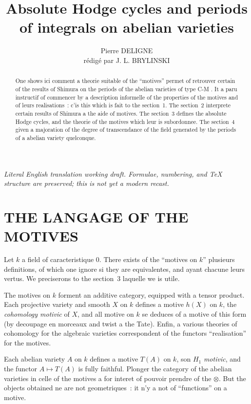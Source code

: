 \documentclass[12pt,a4paper]{article}
\title{Absolute Hodge cycles and periods of integrals on abelian varieties}
\author{Pierre DELIGNE\\\small rédigé par J. L. BRYLINSKI}
\date{}
\theoremstyle{plain}
\theoremstyle{definition}
\theoremstyle{remark}
\begin{document}
\begin{center}\small\emph{Literal English translation working draft. Formulae, numbering, and TeX structure are preserved; this is not yet a modern recast.}\end{center}
\vspace{0.5em}

\maketitle
\thispagestyle{empty}

\begin{abstract}
\noindent
One shows ici comment a theorie suitable of the ``motives'' permet of retrouver certain of the results of Shimura on the periods of the abelian varieties of type C-M \cite{Shimura2}. It a paru instructif of commencer by a description informelle of the properties of the motives and of leurs realisations~: c'is this which is fait to the section~1. The section~2 interprete certain results of Shimura a the aide of motives. The section~3 defines the absolute Hodge cycles, and the theorie of the motives which leur is subordonnee. The section~4 given a majoration of the degree of transcendance of the field generated by the periods of a abelian variety quelconque.
\end{abstract}

\section{THE LANGAGE OF THE MOTIVES}

Let $k$ a field of caracteristique $0$. There exists of the ``motives on $k$'' plusieurs definitions, of which one ignore si they are equivalentes, and ayant chacune leurs vertus. We preciserons to the section~3 laquelle we is utile.

The motives on $k$ forment an additive category, equipped with a tensor product. Each projective variety and smooth $X$ on $k$ defines a motive $h(X)$ on $k$, the \emph{cohomology motivic} of $X$, and all motive on $k$ se deduces of a motive of this form (by decoupage en morceaux and twist a the Tate). Enfin, a various theories of cohomology for the algebraic varieties correspondent of the functors ``realisation'' for the motives.

Each abelian variety $A$ on $k$ defines a motive $T(A)$ on $k$, son $H_1$ \emph{motivic}, and the functor $A \mapsto T(A)$ is fully faithful. Plonger the category of the abelian varieties in celle of the motives a for interet of pouvoir prendre of the $\otimes$. But the objects obtained ne are not geometriques~: it n'y a not of ``functions'' on a motive.
\end{document}
